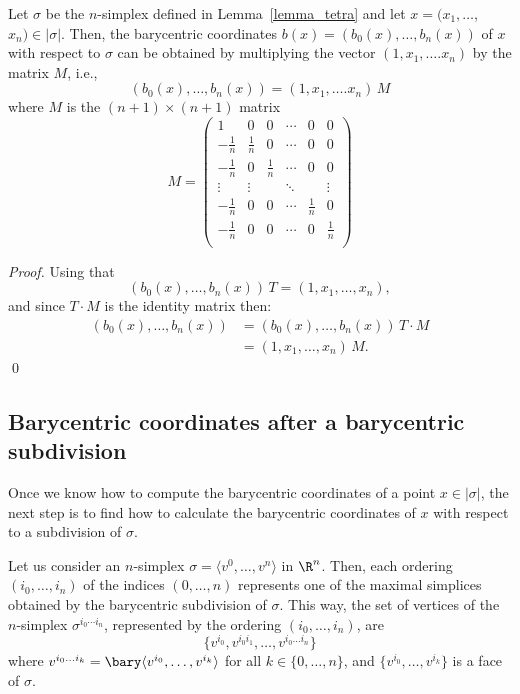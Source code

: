 \begin{lemma}\label{lemma:barycentric_comp}
Let $\sigma$ be the $n$-simplex defined in Lemma~\ref{lemma_tetra} and let $x=(x_1, \dots$, $x_n) \in |\sigma|$. Then, the barycentric coordinates $b(x)=(b_0(x), \dots,b_n(x))$ of $x$ with respect to $\sigma$
can be obtained by multiplying the vector $(1,x_1,\dots.x_n)$ by the matrix $M$, i.e.,
$$ (b_0(x),\dots,b_n(x)) = (1,x_1,\dots.x_n)\,M$$
where $M$ is the $(n+1)\times (n+1)$ matrix
$$M=\begin{pmatrix}
1&0&0&\cdots&0& 0\\
-\frac{1}{n}&\frac{1}{n}&0&\cdots&0& 0\\
-\frac{1}{n}&0&\frac{1}{n}&\cdots& 0&0\\
\vdots&\vdots&&\ddots&&\vdots\\
-\frac{1}{n}&0&0&\cdots& \frac{1}{n}&0\\
-\frac{1}{n}&0&0&\cdots& 0&\frac{1}{n}\\
\end{pmatrix}$$
\end{lemma}


\begin{proof}
Using that 
$$(b_0(x),\dots,b_n(x) )\,T = (1,x_1,\dots,x_n),$$
and since $T\cdot M$ is the identity matrix then:
\begin{equation*}
\begin{split}
 (b_0(x),\dots,b_n(x) ) &=(b_0(x),\dots,b_n(x) )\,T\cdot M\\
 &=(1,x_1,\dots,x_n)\,M.   
\end{split}
\end{equation*}
\qed    
\end{proof}

\subsection{Barycentric coordinates after a barycentric subdivision}\label{subsec:subdivision}

Once we know how to compute the barycentric coordinates of a point $x\in |\sigma|$,  the next step is to find how to calculate the barycentric coordinates of $x$ with respect to a subdivision of $\sigma$.

Let us consider an $n$-simplex $\sigma=\langle  v^0,\dots,v^n\rangle$ in $\R^n$.
Then, each ordering $(i_0,\dots,i_n)$ of the indices $(0,\dots, n)$ represents one of the maximal simplices obtained by the barycentric subdivision of $\sigma$. 
This way, the set of vertices of the $n$-simplex $\sigma^{i_0\cdots i_n}$, represented by the ordering
$(i_0,\dots,i_n)$, are 
$$\{v^{i_0},v^{i_0i_1},\dots, v^{i_0\dots i_n}\}$$
where $ v^{i_0\dots i_k}=\bary \langle v^{i_0},\dots, v^{i_k}\rangle$
for all $k\in\{0,\dots,n\}$,
and $\{
v^{i_0},\dots, v^{i_k}
\} $ is a face of $\sigma$.


